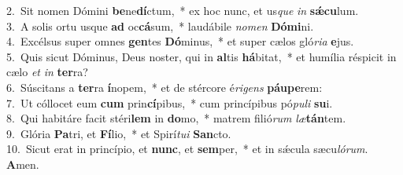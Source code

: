 {2.~}Sit nomen Dómini \textbf{be}ne\textbf{dí}ctum,~* ex hoc nunc, et us\textit{que} \textit{in} \textbf{sǽ}\textbf{cu}lum.\\
{3.~}A solis ortu usque \textbf{ad} oc\textbf{cá}sum,~* laudábile \textit{no}\textit{men} \textbf{Dó}\textbf{mi}ni.\\
{4.~}Excélsus super omnes \textbf{gen}tes \textbf{Dó}minus,~* et super cælos gló\textit{ri}\textit{a} \textbf{e}jus.\\
{5.~}Quis sicut Dóminus, Deus noster, qui in \textbf{al}tis \textbf{há}bitat,~* et humília réspicit in cælo \textit{et} \textit{in} \textbf{ter}ra?\\
{6.~}Súscitans a \textbf{ter}ra \textbf{í}nopem,~* et de stércore é\textit{ri}\textit{gens} \textbf{páu}\textbf{pe}rem:\\
{7.~}Ut cóllocet eum \textbf{cum} prin\textbf{cí}pibus,~* cum princípibus pó\textit{pu}\textit{li} \textbf{su}i.\\
{8.~}Qui habitáre facit stéri\textbf{lem} in \textbf{do}mo,~* matrem filió\textit{rum} \textit{læ}\textbf{tán}tem.\\
{9.~}Glória \textbf{Pa}tri, et \textbf{Fí}lio,~* et Spirí\textit{tu}\textit{i} \textbf{San}cto.\\
{10.~}Sicut erat in princípio, et \textbf{nunc}, et \textbf{sem}per,~* et in sǽcula sæcu\textit{ló}\textit{rum}. \textbf{A}men.\\
